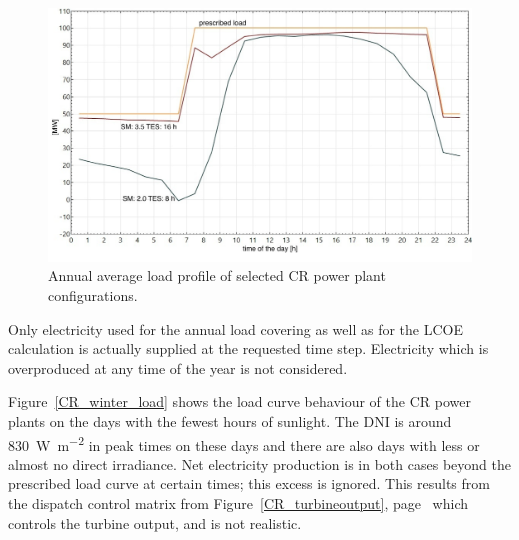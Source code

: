 \begin{figure}[htbp]  
\centering
\includegraphics[width=0.9\linewidth]{FIG/CR_annual_profil}
\caption[Annual average load profile of selected CR power plant configurations.]{Annual average load profile of selected CR power plant configurations.}\label{CR_annual_profil}
\end{figure}
Only electricity used for the annual load covering as well as for the \ac{LCOE} calculation is actually supplied at the requested time step. Electricity which is overproduced at any time of the year is not considered. 

Figure~\ref{CR_winter_load} shows the load curve behaviour of the \ac{CR} power plants on the days with the fewest hours of sunlight. The \ac{DNI} is around \SI{830}{\watt\per\square\metre} in peak times on these days and there are also days with less or almost no direct irradiance. Net electricity production is in both cases beyond the prescribed load curve at certain times; this excess is ignored. This results from the dispatch control matrix from Figure~\ref{CR_turbineoutput}, page~\pageref{CR_turbineoutput} which controls the turbine output, and is not realistic.

